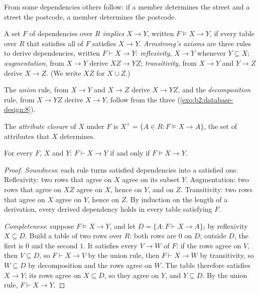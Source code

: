 From some dependencies others follow: if a member determines the street and a street the postcode, a member determines
the postcode.

\begin{definition}\label{def:b2:database-design:armstrong}
A set $F$ of dependencies over $R$ \emph{implies} $X \to Y$, written $F \models X \to
Y$, if every table over $R$ that satisfies all of $F$ satisfies $X \to Y$. \emph{Armstrong's
axioms} are three rules to derive dependencies, written $F \vdash X \to Y$:
\emph{reflexivity}, $X \to Y$ whenever $Y \subseteq X$; \emph{augmentation}, from $X \to Y$ derive $XZ \to YZ$;
\emph{transitivity}, from $X \to Y$ and $Y \to Z$ derive $X \to Z$. (We write $XZ$ for $X \cup Z$.)
\end{definition}

The \emph{union} rule, from $X \to Y$ and $X \to Z$ derive $X \to YZ$, and the \emph{decomposition} rule, from $X \to YZ$
derive $X \to Y$, follow from the three (\cref{exo:b2:database-design:8}).

\begin{definition}\label{def:b2:database-design:closure}
The \emph{attribute closure} of $X$ under $F$ is $X^+ = \{A \in R : F \models X \to A\}$, the
set of attributes that $X$ determines.
\end{definition}

\begin{theorem}\label{thm:b2:database-design:armstrong}
For every $F$, $X$ and $Y$: $F \vdash X \to Y$ if and only if $F \models X \to Y$.
\end{theorem}

\begin{proof}
\emph{Soundness}: each rule turns satisfied dependencies into a satisfied one. Reflexivity: two rows that agree on $X$
agree on its subset $Y$. Augmentation: two rows that agree on $XZ$ agree on $X$, hence on $Y$, and on $Z$. Transitivity:
two rows that agree on $X$ agree on $Y$, hence on $Z$. By induction on the length of a derivation, every derived
dependency holds in every table satisfying $F$.

\emph{Completeness}: suppose $F \models X \to Y$, and let $D = \{A : F \vdash X \to A\}$; by reflexivity $X \subseteq D$.
Build a table of two rows over $R$: both rows are $0$ on $D$; outside $D$, the first is $0$ and the second $1$. It
satisfies every $V \to W$ of $F$: if the rows agree on $V$, then $V \subseteq D$, so $F \vdash X \to V$ by the union rule,
then $F \vdash X \to W$ by transitivity, so $W \subseteq D$ by decomposition and the rows agree on $W$. The table
therefore satisfies $X \to Y$; its rows agree on $X \subseteq D$, so they agree on $Y$, and $Y \subseteq D$. By the union
rule, $F \vdash X \to Y$.
\end{proof}

